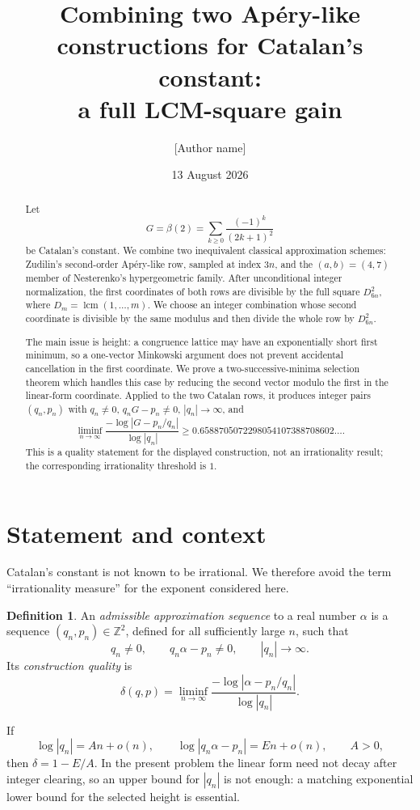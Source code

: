 \documentclass[11pt]{article}
\title{Combining two Ap\'ery-like constructions for Catalan's constant:\\a full LCM-square gain}
\author{[Author name]}
\date{13 August 2026}
\theoremstyle{definition}
\newtheorem{definition}[theorem]{Definition}
\theoremstyle{remark}
\newcommand{\Z}{\mathbb Z}
\newcommand{\lcmop}{\operatorname{lcm}}
\begin{document}
\maketitle

\begin{abstract}
Let
\[
G=\beta(2)=\sum_{k\ge0}\frac{(-1)^k}{(2k+1)^2}
\]
be Catalan's constant.  We combine two inequivalent classical approximation schemes: Zudilin's second-order Ap\'ery-like row, sampled at index $3n$, and the $(a,b)=(4,7)$ member of Nesterenko's hypergeometric family.  After unconditional integer normalization, the first coordinates of both rows are divisible by the full square
$D_{6n}^2$, where $D_m=\lcmop(1,\dots,m)$.  We choose an integer combination whose second coordinate is divisible by the same modulus and then divide the whole row by $D_{6n}^2$.

The main issue is height: a congruence lattice may have an exponentially short first minimum, so a one-vector Minkowski argument does not prevent accidental cancellation in the first coordinate.  We prove a two-successive-minima selection theorem which handles this case by reducing the second vector modulo the first in the linear-form coordinate.  Applied to the two Catalan rows, it produces integer pairs $(q_n,p_n)$ with $q_n\ne0$, $q_nG-p_n\ne0$, $|q_n|\to\infty$, and
\[
\liminf_{n\to\infty}
\frac{-\log|G-p_n/q_n|}{\log|q_n|}
\ge
0.6588705072298054107388708602\ldots .
\]
This is a quality statement for the displayed construction, not an irrationality result; the corresponding irrationality threshold is $1$.
\end{abstract}

\section{Statement and context}
Catalan's constant is not known to be irrational.  We therefore avoid the term ``irrationality measure'' for the exponent considered here.

\begin{definition}
An \emph{admissible approximation sequence} to a real number $\alpha$ is a sequence $(q_n,p_n)\in\Z^2$, defined for all sufficiently large $n$, such that
\[
q_n\ne0,\qquad q_n\alpha-p_n\ne0,\qquad |q_n|\to\infty.
\]
Its \emph{construction quality} is
\[
\delta(q,p)=\liminf_{n\to\infty}
\frac{-\log|\alpha-p_n/q_n|}{\log|q_n|}.
\]
\end{definition}

If
\[
\log|q_n|=An+o(n),\qquad
\log|q_n\alpha-p_n|=En+o(n),\qquad A>0,
\]
then $\delta=1-E/A$.  In the present problem the linear form need not decay after integer clearing, so an upper bound for $|q_n|$ is not enough: a matching exponential lower bound for the selected height is essential.
\end{document}
